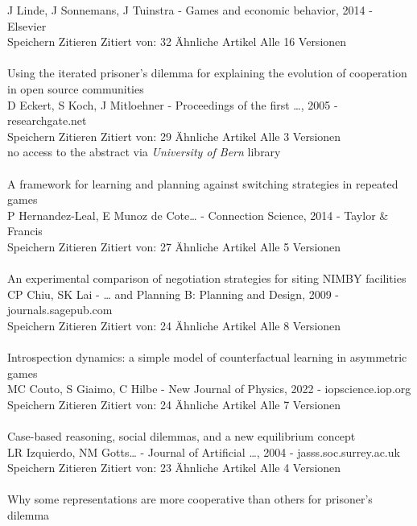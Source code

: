 \documentclass[11pt]{article}
\begin{document}
J Linde, J Sonnemans, J Tuinstra - Games and economic behavior, 2014 - Elsevier\\
Speichern Zitieren Zitiert von: 32 Ähnliche Artikel Alle 16 Versionen\\
\\
\noindent
[PDF] Using the iterated prisoner's dilemma for explaining the evolution of cooperation in open source communities\\
D Eckert, S Koch, J Mitloehner - Proceedings of the first …, 2005 - researchgate.net\\
Speichern Zitieren Zitiert von: 29 Ähnliche Artikel Alle 3 Versionen\\
\lbrack no access to the abstract via \textit{University of Bern} library\rbrack\\
\\
\noindent 
A framework for learning and planning against switching strategies in repeated games\\
P Hernandez-Leal, E Munoz de Cote… - Connection Science, 2014 - Taylor \& Francis\\
Speichern Zitieren Zitiert von: 27 Ähnliche Artikel Alle 5 Versionen\\
\\
\noindent 
An experimental comparison of negotiation strategies for siting NIMBY facilities\\
CP Chiu, SK Lai - … and Planning B: Planning and Design, 2009 - journals.sagepub.com\\
Speichern Zitieren Zitiert von: 24 Ähnliche Artikel Alle 8 Versionen\\
\\
\noindent 
[HTML] Introspection dynamics: a simple model of counterfactual learning in asymmetric games\\
MC Couto, S Giaimo, C Hilbe - New Journal of Physics, 2022 - iopscience.iop.org\\
Speichern Zitieren Zitiert von: 24 Ähnliche Artikel Alle 7 Versionen\\
\\
\noindent 
[HTML] Case-based reasoning, social dilemmas, and a new equilibrium concept\\
LR Izquierdo, NM Gotts… - Journal of Artificial …, 2004 - jasss.soc.surrey.ac.uk\\
Speichern Zitieren Zitiert von: 23 Ähnliche Artikel Alle 4 Versionen\\
\\
\noindent 
Why some representations are more cooperative than others for prisoner's dilemma\\
\end{document}
